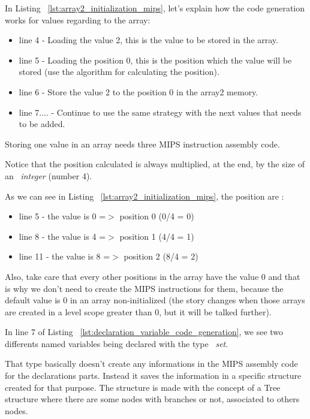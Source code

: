 \documentclass[
  oneside,
  11pt, a4paper,
  footinclude=true,
  headinclude=true,
  cleardoublepage=empty
]{scrbook}
\begin{document}
In Listing ~\ref{lst:array2_initialization_mips}, let's explain how the code generation works for values regarding to the array:

\begin{itemize}
\item line 4 - Loading the value 2, this is the value to be stored in the array.
\item line 5 - Loading the position 0, this is the position which the value will be stored (use the algorithm for calculating the position).
\item line 6 - Store the value 2 to the position 0 in the array2 memory.
\item line 7.... - Continue to use the same strategy with the next values that needs to be added.
\end{itemize}

Storing one value in an array needs three MIPS instruction assembly code.

Notice that the position calculated is always multiplied, at the end, by the size of an ~\textit{integer} (number 4).

As we can see in Listing ~\ref{lst:array2_initialization_mips}, the position are :

\begin{itemize}
\item line 5 - the value is 0 =$>$ position 0 (0/4 = 0)
\item line 8 - the value is 4 =$>$ position 1 (4/4 = 1)
\item line 11 - the value is 8 =$>$ position 2 (8/4 = 2)
\end{itemize}

Also, take care that every other positions in the array have the value 0 and that is why we don't need to create the MIPS instructions for them, because the default value is 0 in an array non-initialized (the story changes when those arrays are created in a level scope greater than 0, but it will be talked further).

In line 7 of Listing ~\ref{lst:declaration_variable_code_generation}, we see two differents named variables being declared with the type ~\textit{set}.

That type basically doesn't create any informations in the MIPS assembly code for the declarations parts. Instead it saves the information in a specific structure created for that purpose. The structure is made with the concept of a Tree structure where there are some nodes with branches or not, associated to others nodes.
\end{document}
